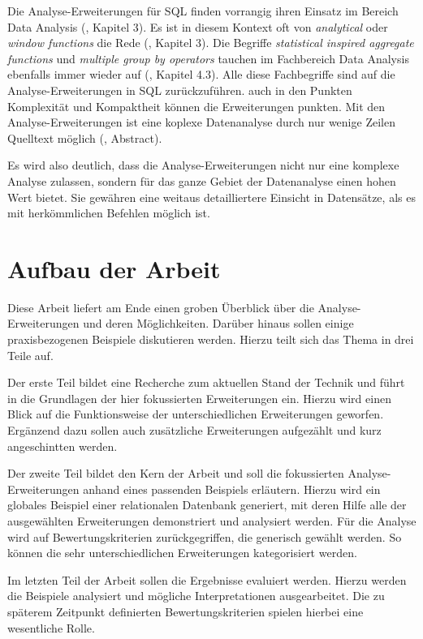 Die Analyse-Erweiterungen für SQL finden vorrangig ihren Einsatz im Bereich Data
Analysis (\cite{FOTACHE2015243}, Kapitel 3). Es ist in diesem Kontext oft von \textit{analytical}
oder \textit{window functions} die Rede (\cite{FOTACHE2015243}, Kapitel 3). Die Begriffe
\textit{statistical inspired aggregate functions} und \textit{multiple group by
operators} tauchen im Fachbereich Data Analysis ebenfalls immer wieder auf (\cite{FOTACHE2015243},
Kapitel 4.3). Alle diese Fachbegriffe sind auf die Analyse-Erweiterungen in SQL zurückzuführen.
auch in den Punkten Komplexität und Kompaktheit können die Erweiterungen punkten.
Mit den Analyse-Erweiterungen ist eine koplexe Datenanalyse durch nur wenige Zeilen
Quelltext möglich (\cite{Maue2022}, Abstract).

Es wird also deutlich, dass die Analyse-Erweiterungen nicht nur eine komplexe Analyse
zulassen, sondern für das ganze Gebiet der Datenanalyse einen hohen Wert bietet.
Sie gewähren eine weitaus detailliertere Einsicht in Datensätze, als es mit
herkömmlichen Befehlen möglich ist.

\section{Aufbau der Arbeit}
Diese Arbeit liefert am Ende einen groben Überblick über die Analyse-Erweiterungen
und deren Möglichkeiten. Darüber hinaus sollen einige praxisbezogenen Beispiele diskutieren
werden. Hierzu teilt sich das Thema in drei Teile auf.

Der erste Teil bildet eine Recherche zum aktuellen Stand der Technik und führt
in die Grundlagen der hier fokussierten Erweiterungen ein. Hierzu wird einen Blick
auf die Funktionsweise der unterschiedlichen Erweiterungen geworfen. Ergänzend
dazu sollen auch zusätzliche Erweiterungen aufgezählt und kurz angeschintten
werden.

Der zweite Teil bildet den Kern der Arbeit und soll die fokussierten Analyse-Erweiterungen
anhand eines passenden Beispiels erläutern. Hierzu wird ein globales Beispiel einer
relationalen Datenbank generiert, mit deren Hilfe alle der ausgewählten
Erweiterungen demonstriert und analysiert werden. Für die Analyse wird auf Bewertungskriterien
zurückgegriffen, die generisch gewählt werden. So können die sehr unterschiedlichen
Erweiterungen kategorisiert werden.

Im letzten Teil der Arbeit sollen die Ergebnisse evaluiert werden. Hierzu werden
die Beispiele analysiert und mögliche Interpretationen ausgearbeitet. Die zu späterem
Zeitpunkt definierten Bewertungskriterien spielen hierbei eine wesentliche Rolle.

